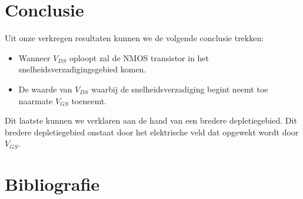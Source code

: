 \documentclass{scrartcl}  %
\begin{document}
\section{Conclusie}
Uit onze verkregen resultaten kunnen we de volgende conclusie trekken: 
\begin{itemize}
	\item Wanneer $V_{DS}$ oploopt zal de NMOS transistor in het snelheidsverzadigingsgebied komen.
	\item De waarde van $V_{DS}$ waarbij de snelheidsverzadiging begint neemt toe naarmate $V_{GS}$ toeneemt.
\end{itemize}
Dit laatste kunnen we verklaren aan de hand van een bredere depletiegebied. 
Dit bredere depletiegebied onstaat door het elektrische veld dat opgewekt wordt door $V_{GS}$.

\newpage
{}
\section{Bibliografie}
\printbibliography
\end{document}
